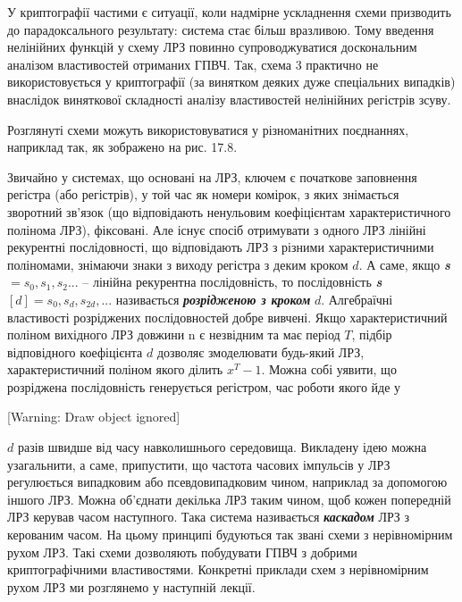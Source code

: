 \documentclass[a4paper]{article}
\newcounter{}
\begin{document}
\bigskip


\bigskip

{\par}


\bigskip

 У криптографії частими є ситуації, коли надмірне ускладнення схеми призводить
до парадоксального результату: система стає більш вразливою. Тому введення
нелінійних функцій у схему ЛРЗ повинно супроводжуватися доскональним аналізом
властивостей отриманих ГПВЧ.  Так, схема 3 практично не використовується у
криптографії (за винятком деяких дуже спеціальних випадків)  внаслідок
виняткової складності  аналізу властивостей нелінійних регістрів зсуву.

Розглянуті схеми можуть використовуватися у різноманітних поєднаннях, наприклад
так, як зображено на рис. 17.8. 

Звичайно у системах, що основані на ЛРЗ, ключем є початкове заповнення регістра
(або регістрів), у той час як номери комірок, з яких знімається зворотний
зв’язок (що відповідають ненульовим коефіцієнтам характеристичного полінома
ЛРЗ), фіксовані. Але існує спосіб отримувати з одного ЛРЗ лінійні рекурентні
послідовності, що відповідають ЛРЗ з різними характеристичними поліномами,
знімаючи знаки з виходу регістра з деким кроком  ${d}$. А саме, якщо
\textbf{\textit{s}} ${=s_{{0}},s_{{1}},s_{{2}}\text{.}\text{.}\text{.}}$ –
лінійна рекурентна послідовність, то послідовність \textbf{\textit{s}}
${[d]=s_{{0}},s_{{d}},s_{{2d}},\text{.}\text{.}\text{.}}$ називається
\textbf{\textit{розрідженою з кроком}}\textbf{ } ${d}$. Алгебраїчні властивості
розріджених послідовностей добре вивчені. Якщо характеристичний поліном
вихідного ЛРЗ довжини n є незвідним та має період  ${T}$, підбір відповідного
коефіцієнта  ${d}$ дозволяє змоделювати будь-який ЛРЗ, характеристичний поліном
якого ділить  ${x^{{T}}-1}$. Можна собі уявити, що розріджена послідовність
генерується регістром, час роботи якого йде у

[Warning: Draw object ignored] 

 ${d}$ разів швидше від часу навколишнього середовища. Викладену ідею можна
узагальнити, а саме, припустити, що частота часових імпульсів у ЛРЗ регулюється
випадковим або псевдовипадковим чином, наприклад за допомогою іншого ЛРЗ. Можна
об’єднати декілька ЛРЗ таким чином, щоб кожен попередній ЛРЗ керував часом
наступного. Така система називається \textbf{\textit{каскадом}}\textit{ }ЛРЗ з
керованим часом. На цьому принципі будуються так звані схеми з нерівномірним
рухом ЛРЗ. Такі схеми дозволяють побудувати ГПВЧ з добрими криптографічними
властивостями. Конкретні приклади схем з нерівномірним рухом ЛРЗ ми розглянемо
у наступній лекції.
\end{document}
